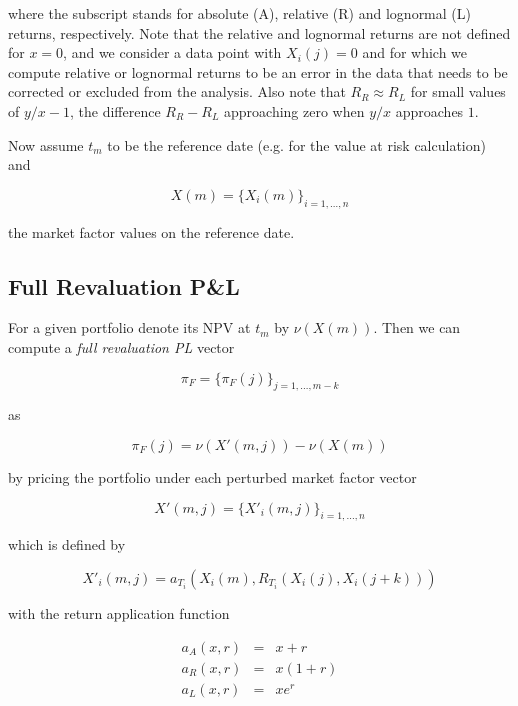 where the subscript stands for absolute (A), relative (R) and lognormal (L) returns, respectively. Note that the
relative and lognormal returns are not defined for $x=0$, and we consider a data point with $X_i(j)=0$ and for which we
compute relative or lognormal returns to be an error in the data that needs to be corrected or excluded from the
analysis. Also note that $R_R \approx R_L$ for small values of $y/x-1$, the difference $R_R-R_L$ approaching zero when
$y/x$ approaches $1$.

Now assume $t_m$ to be the reference date (e.g. for the value at risk calculation) and

\begin{equation}
  X(m) = \{ X_i(m) \}_{i=1,\ldots,n}
\end{equation}

the market factor values on the reference date.

\subsection*{Full Revaluation P\&L}\label{fullpl}

For a given portfolio denote its NPV at $t_m$ by $\nu(X(m))$. Then we can compute a {\em full revaluation PL} vector

\begin{equation}\label{fullrevalpl}
\pi_F = \{ \pi_F(j) \}_{j=1,\ldots,m-k}
\end{equation}

as

\begin{equation}
  \pi_F(j) = \nu( X'(m,j) ) - \nu ( X(m) )
\end{equation}

by pricing the portfolio under each perturbed market factor vector

\begin{equation}
  X'(m,j) = \{ X'_i(m,j) \}_{i=1,\ldots,n}
\end{equation}

which is defined by

\begin{equation}\label{histReturns}
  X'_i(m,j) = a_{T_i}( X_i(m),  R_{T_i}(X_i(j),X_i(j+k)) )
\end{equation}

with the return application function

\begin{eqnarray}
  a_A(x,r) &=& x+r \\
  a_R(x,r) &=& x(1+r) \\
  a_L(x,r) &=& x e^r
\end{eqnarray}

